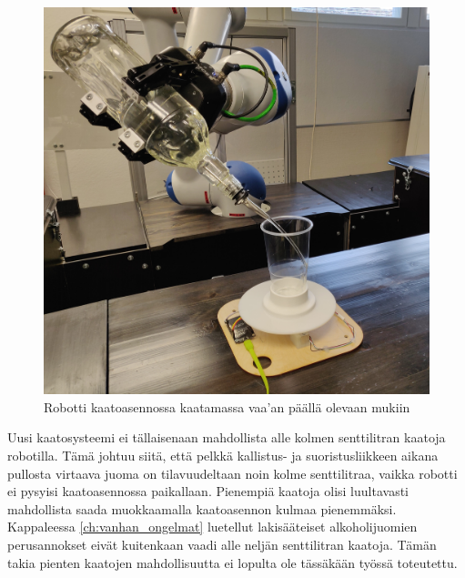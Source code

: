 \begin{figure}[h]
\begin{center}
\includegraphics[scale=0.1]{img/kaato.jpg}
\end{center}
\caption{Robotti kaatoasennossa kaatamassa vaa'an päällä olevaan mukiin}
\label{fig:kaato}
\end{figure}

\newpage

Uusi kaatosysteemi ei tällaisenaan mahdollista alle kolmen senttilitran kaatoja robotilla. Tämä johtuu siitä, että pelkkä kallistus- ja suoristusliikkeen aikana pullosta virtaava juoma on tilavuudeltaan noin kolme senttilitraa, vaikka robotti ei pysyisi kaatoasennossa paikallaan. Pienempiä kaatoja olisi luultavasti mahdollista saada muokkaamalla kaatoasennon kulmaa pienemmäksi. Kappaleessa \ref{ch:vanhan_ongelmat} luetellut lakisääteiset alkoholijuomien perusannokset eivät kuitenkaan vaadi alle neljän senttilitran kaatoja. Tämän takia pienten kaatojen mahdollisuutta ei lopulta ole tässäkään työssä toteutettu.
